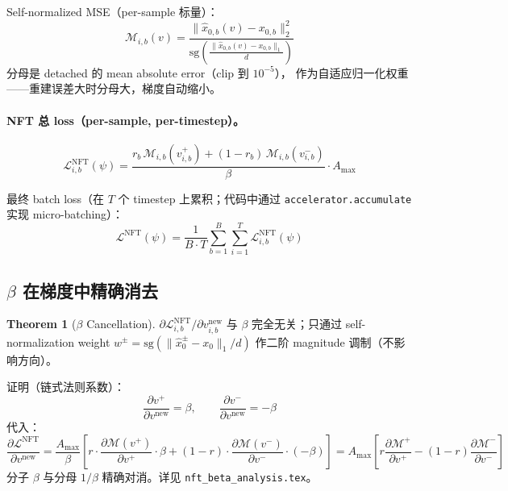 \documentclass[11pt,a4paper]{article}
\newcommand{\loss}{\mathcal{L}}
\newcommand{\sg}{\mathrm{sg}}
\theoremstyle{definition}
\newtheorem{theorem}{Theorem}
\begin{document}
Self-normalized MSE（per-sample 标量）：
\begin{equation}
\boxed{
\mathcal{M}_{i,b}(v) =
\frac{\|\hat{x}_{0,b}(v) - x_{0,b}\|_2^2}
{\sg\!\left(\frac{\|\hat{x}_{0,b}(v) - x_{0,b}\|_1}{d}\right)}
}
\label{eq:self_norm_mse}
\end{equation}
分母是 detached 的 mean absolute error（clip 到 $10^{-5}$），
作为自适应归一化权重——重建误差大时分母大，梯度自动缩小。

\paragraph{NFT 总 loss（per-sample, per-timestep）。}
\begin{equation}
\boxed{
\loss_{i,b}^{\text{NFT}}(\psi)
= \frac{r_b\,\mathcal{M}_{i,b}(v_{i,b}^{+}) + (1 - r_b)\,\mathcal{M}_{i,b}(v_{i,b}^{-})}{\beta}\cdot A_{\max}
}
\label{eq:nft_loss_full}
\end{equation}

最终 batch loss（在 $T$ 个 timestep 上累积；代码中通过
\texttt{accelerator.accumulate} 实现 micro-batching）：
\begin{equation}
\loss^{\text{NFT}}(\psi)
= \frac{1}{B \cdot T}\sum_{b=1}^B \sum_{i=1}^T \loss_{i,b}^{\text{NFT}}(\psi)
\label{eq:nft_total}
\end{equation}

\subsection{$\beta$ 在梯度中精确消去}
\label{subsec:beta_cancels}

\begin{theorem}[$\beta$ Cancellation]
\label{thm:beta_cancel}
$\partial \loss_{i,b}^{\text{NFT}}/\partial v_{i,b}^{\text{new}}$ 与 $\beta$
完全无关；只通过 self-normalization weight $w^{\pm} = \sg(\|\hat{x}_0^{\pm} - x_0\|_1 / d)$
作二阶 magnitude 调制（不影响方向）。
\end{theorem}

证明（链式法则系数）：
\begin{equation}
\frac{\partial v^{+}}{\partial v^{\text{new}}} = \beta,\qquad
\frac{\partial v^{-}}{\partial v^{\text{new}}} = -\beta
\end{equation}
代入：
\begin{equation}
\frac{\partial \loss^{\text{NFT}}}{\partial v^{\text{new}}}
= \frac{A_{\max}}{\beta}\!\left[r\!\cdot\!\frac{\partial \mathcal{M}(v^+)}{\partial v^+}\!\cdot\!\beta
+ (1{-}r)\!\cdot\!\frac{\partial \mathcal{M}(v^-)}{\partial v^-}\!\cdot\!(-\beta)\right]
= A_{\max}\!\left[r\frac{\partial \mathcal{M}^+}{\partial v^+} - (1{-}r)\frac{\partial \mathcal{M}^-}{\partial v^-}\right]
\end{equation}
分子 $\beta$ 与分母 $1/\beta$ 精确对消。详见 \texttt{nft\_beta\_analysis.tex}。
\end{document}
